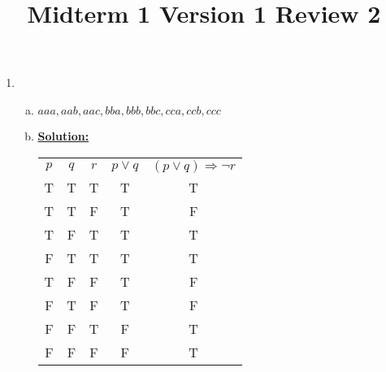 \documentclass[12pt]{article}
\begin{document}
\title{Midterm 1 Version 1 Review 2}
\maketitle

\begin{enumerate}[1.]
    \item

    \begin{enumerate}[a)]
        \item ${aaa,aab,aac,bba,bbb,bbc,cca,ccb,ccc}$
        \item

        \underline{\textbf{Solution:}}

        \begin{tabular}{|c|c|c|c|c|}
            \hline
            $p$ & $q$ & $r$ & $p \lor q$ & $(p \lor q) \Rightarrow \neg r$\\
            T & T & T & T & T \\
            \hline
            T & T & F & T & F \\
            \hline
            T & F & T & T & T \\
            \hline
            F & T & T & T & T \\
            \hline
            T & F & F & T & F \\
            \hline
            F & T & F & T & F \\
            \hline
            F & F & T & F & T \\
            \hline
            F & F & F & F & T \\
            \hline
        \end{tabular}
    \end{enumerate}
\end{enumerate}
\end{document}
